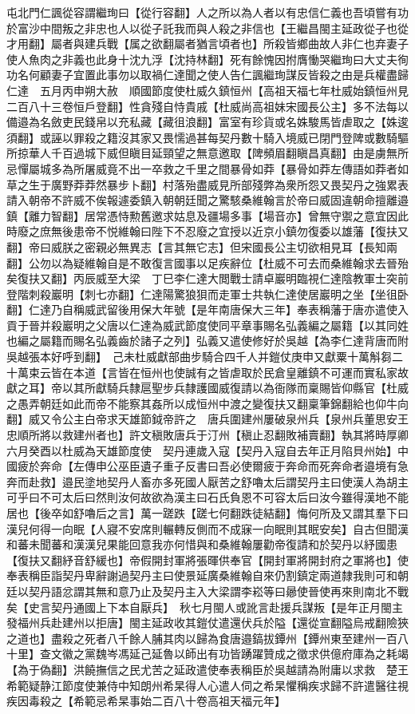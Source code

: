 屯北門仁諷從容謂繼珣曰【從行容翻】人之所以為人者以有忠信仁義也吾頃嘗有功於富沙中間叛之非忠也人以從子託我而與人殺之非信也【王繼昌閩主延政從子也從才用翻】屬者與建兵戰【属之欲翻屬者猶言頃者也】所殺皆鄉曲故人非仁也弃妻子使人魚肉之非義也此身十沈九浮【沈持林翻】死有餘愧因拊膺慟哭繼珣曰大丈夫徇功名何顧妻子宜置此事勿以取禍仁達聞之使人告仁諷繼珣謀反皆殺之由是兵權盡歸仁達　五月丙申朔大赦　順國節度使杜威久鎮恒州【高祖天福七年杜威始鎮恒州見二百八十三卷恒戶登翻】性貪殘自恃貴戚【杜威尚高祖妹宋國長公主】多不法每以備邉為名斂吏民錢帛以充私藏【藏徂浪翻】富室有珍貨或名姝駿馬皆虐取之【姝逡須翻】或誣以罪殺之籍沒其家又畏懦過甚每契丹數十騎入境威已閉門登陴或數騎驅所掠華人千百過城下威但瞋目延頸望之無意邀取【陴頻眉翻瞋昌真翻】由是虜無所忌憚屬城多為所屠威竟不出一卒救之千里之間暴骨如莽【暴骨如莽左傳語如莽者如草之生于廣野莽莽然暴步卜翻】村落殆盡威見所部殘弊為衆所怨又畏契丹之強累表請入朝帝不許威不俟報遽委鎮入朝朝廷聞之驚駭桑維翰言於帝曰威固違朝命擅離邉鎮【離力智翻】居常憑恃勲舊邀求姑息及疆場多事【場音亦】曾無守禦之意宜因此時廢之庶無後患帝不悦維翰曰陛下不忍廢之宜授以近京小鎮勿復委以雄藩【復扶又翻】帝曰威朕之密親必無異志【言其無它志】但宋國長公主切欲相見耳【長知兩翻】公勿以為疑維翰自是不敢復言國事以足疾辭位【杜威不可去而桑維翰求去晉殆矣復扶又翻】丙辰威至大梁　丁巳李仁達大閲戰士請卓巖明臨視仁達陰教軍士突前登階刺殺巖明【刺七亦翻】仁達陽驚狼狽而走軍士共執仁達使居巖明之坐【坐徂卧翻】仁達乃自稱威武留後用保大年號【是年南唐保大三年】奉表稱藩于唐亦遣使入貢于晉并殺巖明之父唐以仁達為威武節度使同平章事賜名弘義編之屬籍【以其同姓也編之屬籍而賜名弘義齒於諸子之列】弘義又遣使修好於吳越【為李仁達背唐而附吳越張本好呼到翻】　己未杜威獻部曲步騎合四千人并鎧仗庚申又獻粟十萬斛芻二十萬束云皆在本道【言皆在恒州也使誠有之皆虐取於民倉皇離鎮不可運而實私家故獻之耳】帝以其所獻騎兵隸扈聖步兵隸護國威復請以為衙隊而稟賜皆仰縣官【杜威之愚弄朝廷如此而帝不能察其姦所以成恒州中渡之變復扶又翻稟筆錦翻給也仰牛向翻】威又令公主白帝求天雄節鉞帝許之　唐兵圍建州屢破泉州兵【泉州兵董思安王忠順所將以救建州者也】許文稹敗唐兵于汀州【稹止忍翻敗補賣翻】執其將時厚卿　六月癸酉以杜威為天雄節度使　契丹連歲入寇【契丹入寇自去年正月陷貝州始】中國疲於奔命【左傳申公巫臣遺子重子反書曰吾必使爾疲于奔命而死奔命者邉境有急奔而赴救】邉民塗地契丹人畜亦多死國人厭苦之舒嚕太后謂契丹主曰使漢人為胡主可乎曰不可太后曰然則汝何故欲為漢主曰石氏負恩不可容太后曰汝今雖得漢地不能居也【後卒如舒嚕后之言】萬一蹉跌【蹉七何翻跌徒結翻】悔何所及又謂其羣下曰漢兒何得一向眠【人寢不安席則輾轉反側而不成寐一向眠則其眠安矣】自古但聞漢和蕃未聞蕃和漢漢兒果能回意我亦何惜與和桑維翰屢勸帝復請和於契丹以紓國患【復扶又翻紓音舒緩也】帝假開封軍將張暉供奉官【開封軍將開封府之軍將也】使奉表稱臣詣契丹卑辭謝過契丹主曰使景延廣桑維翰自來仍割鎮定兩道隸我則可和朝廷以契丹語忿謂其無和意乃止及契丹主入大梁謂李崧等曰曏使晉使再來則南北不戰矣【史言契丹通國上下本自厭兵】　秋七月閩人或訛言赴援兵謀叛【是年正月閩主發福州兵赴建州以拒唐】閩主延政收其鎧仗遣還伏兵於隘【還從宣翻隘烏戒翻險狹之道也】盡殺之死者八千餘人脯其肉以歸為食唐邉鎬拔鐔州【鐔州東至建州一百八十里】查文徽之黨魏岑馮延己延魯以師出有功皆踴躍贊成之徵求供億府庫為之耗竭【為于偽翻】洪饒撫信之民尤苦之延政遣使奉表稱臣於吳越請為附庸以求救　楚王希範疑静江節度使兼侍中知朗州希杲得人心遣人伺之希杲懼稱疾求歸不許遣醫往視疾因毒殺之【希範忌希杲事始二百八十卷高祖天福元年】

